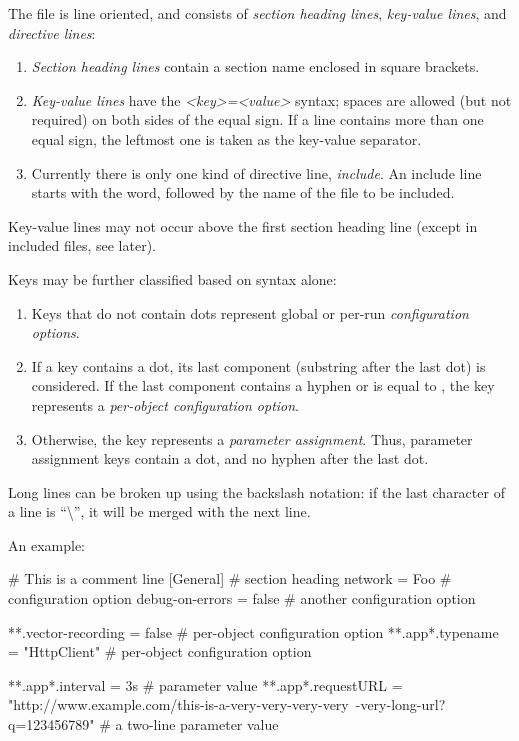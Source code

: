 The file is line oriented, and consists of \textit{section heading lines},
\textit{key-value lines}, and \textit{directive lines}:

\begin{enumerate}
\item \textit{Section heading lines} contain a section name enclosed in square brackets.
\item \textit{Key-value lines} have the \textit{<key>=<value>} syntax; spaces
      are allowed (but not required) on both sides of the equal sign.
      If a line contains more than one equal sign, the leftmost one is taken
      as the key-value separator.
\item Currently there is only one kind of directive line, \textit{include}. An
      include line starts with the  word, followed by the name of
      the file to be included.
\end{enumerate}

Key-value lines may not occur above the first section heading line (except
in included files, see later).

Keys may be further classified based on syntax alone:

\begin{enumerate}
\item Keys that do not contain dots represent global or per-run \textit{configuration options}.
\item If a key contains a dot, its last component (substring after the last dot)
      is considered. If the last component contains a hyphen or is equal to
      , the key represents a \textit{per-object configuration option}.
\item Otherwise, the key represents a \textit{parameter assignment}. Thus, parameter
      assignment keys contain a dot, and no hyphen after the last dot.
\end{enumerate}

Long lines can be broken up using the backslash notation: if the last
character of a line is ``\textbackslash'', it will be merged with the next
line.

An example:

\begin{inifile}
# This is a comment line
[General]                       # section heading
network = Foo                   # configuration option
debug-on-errors = false         # another configuration option

**.vector-recording = false     # per-object configuration option
**.app*.typename = "HttpClient" # per-object configuration option

**.app*.interval = 3s           # parameter value
**.app*.requestURL = "http://www.example.com/this-is-a-very-very-very-very\
-very-long-url?q=123456789"     # a two-line parameter value
\end{inifile}

